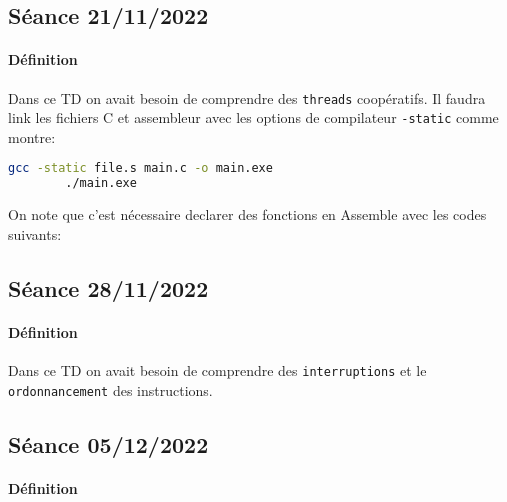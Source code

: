 \documentclass{article}
\begin{document}
\newpage\subsection{Séance 21/11/2022}
\paragraph{Définition}Dans ce TD on avait besoin de comprendre des \texttt{threads} coopératifs. Il faudra link les fichiers C et assembleur avec les options de compilateur \texttt{-static} comme montre:
\begin{scriptsize}\mycode
    \begin{lstlisting}[language=Bash]
        gcc -static file.s main.c -o main.exe
        ./main.exe
    \end{lstlisting}
\end{scriptsize}
On note que c'est nécessaire declarer des fonctions en Assemble avec les codes suivants:
\begin{scriptsize}\mycode
    
\end{scriptsize}
\begin{scriptsize}\myRISCV
    
\end{scriptsize}

\newpage\subsection{Séance 28/11/2022}
\paragraph{Définition}Dans ce TD on avait besoin de comprendre des \texttt{interruptions} et le \texttt{ordonnancement} des instructions.
\begin{scriptsize}\mycode
    
\end{scriptsize}

\newpage\subsection{Séance 05/12/2022}
\paragraph{Définition}
\begin{scriptsize}\mycode
    
\end{scriptsize}
\end{document}
